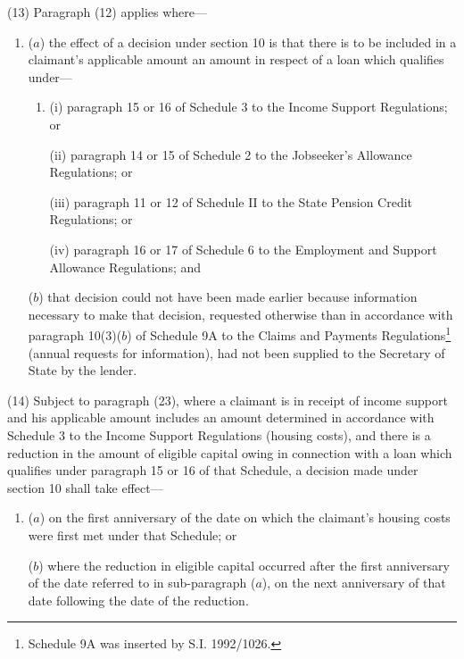 \documentclass[12pt,a4paper]{article}
\begin{document}
(13) Paragraph (12) applies where—
\begin{enumerate}\item[]
($a$) the effect of a decision under section 10 is that there is to be included in a claimant’s applicable amount an amount in respect of a loan which qualifies under—
\begin{enumerate}\item[]
(i) paragraph 15 or 16 of Schedule 3 to the Income Support Regulations; or

(ii) paragraph 14 or 15 of Schedule 2 to the Jobseeker’s Allowance Regulations;
or

    (iii) 
    paragraph 11 or 12 of Schedule II to the State Pension Credit Regulations; 
or  %

(iv) paragraph 16 or 17 of Schedule 6 to the Employment and Support Allowance Regulations; and
\end{enumerate}

($b$) that decision could not have been made earlier because information necessary to make that decision, requested otherwise than in accordance with paragraph 10(3)($b$) of Schedule 9A to the Claims and Payments Regulations\footnote{\frenchspacing Schedule 9A was inserted by S.I. 1992/1026.} (annual requests for information), had not been supplied to the Secretary of State by the lender.
\end{enumerate}

(14) Subject to paragraph (23), where a claimant is in receipt of income support and his applicable amount includes an amount determined in accordance with Schedule 3 to the Income Support Regulations (housing costs), and there is a reduction in the amount of eligible capital owing in connection with a loan which qualifies under paragraph 15 or 16 of that Schedule, a decision made under section 10 shall take effect—
\begin{enumerate}\item[]
($a$) on the first anniversary of the date on which the claimant’s housing costs were first met under that Schedule; or

($b$) where the reduction in eligible capital occurred after the first anniversary of the date referred to in sub-paragraph ($a$), on the next anniversary of that date following the date of the reduction.
\end{enumerate}
\end{document}
